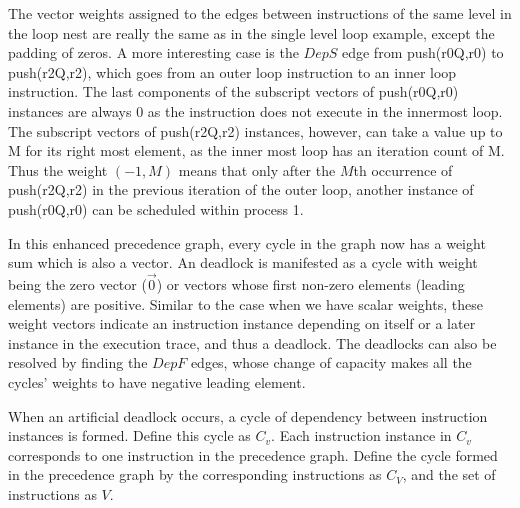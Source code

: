 The vector weights assigned to the edges between instructions of
the same level in the loop nest are really the same as in the single level loop
example, except the padding of zeros. A more interesting case is the $DepS$ edge from push(r0Q,r0) to push(r2Q,r2), which goes from an outer loop instruction to an inner loop instruction. 
The last components of the subscript vectors of push(r0Q,r0) instances are always 0
as the instruction does not execute in the innermost loop. The subscript vectors of push(r2Q,r2) instances, however, can take a value up to M for its right most element, as the inner most loop has an iteration count of M. 
Thus the weight $(-1,M)$ means that only after the $M$th occurrence of  push(r2Q,r2) in the previous iteration of the outer loop, another instance of push(r0Q,r0) can be scheduled within process 1.




In this enhanced precedence graph, 
every cycle in the graph now has a weight sum which is also a vector. 
An deadlock is manifested as a cycle with weight being the zero vector ($\vec{0}$)
or vectors whose first non-zero elements (leading elements) are positive.
Similar to the case when we have scalar
weights, these weight vectors 
indicate an instruction instance depending on itself or a later instance in the execution trace, and thus a deadlock. The deadlocks can also be
resolved by finding the $DepF$ edges, whose change of capacity makes
all the cycles' weights to have negative  leading element. 


\begin{definition}
When an artificial deadlock occurs, a cycle of dependency between instruction instances is formed. Define this cycle as $C_v$. Each instruction instance in $C_v$ corresponds to one instruction in the precedence graph. Define the cycle formed in the precedence graph by the corresponding instructions as $C_V$, and the set of instructions
as $V$. 
\end{definition}

